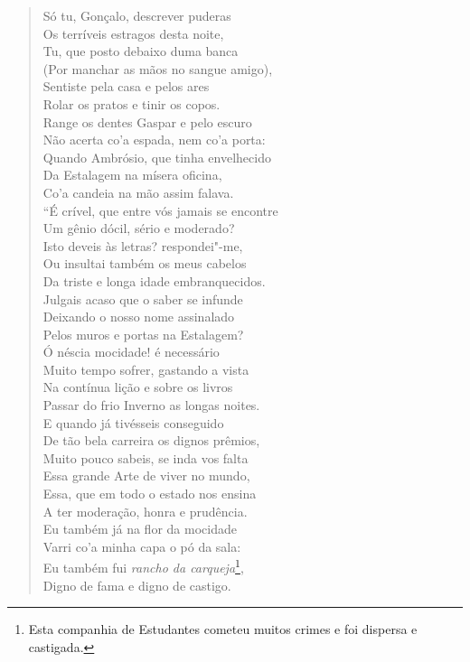 \begin{verse}
Só tu, Gonçalo, descrever puderas\\
Os terríveis estragos desta noite,\\
Tu, que posto debaixo duma banca\\
(Por manchar as mãos no sangue amigo),\\
Sentiste pela casa e pelos ares\\
Rolar os pratos e tinir os copos.\\
Range os dentes Gaspar e pelo escuro\\
Não acerta co'a espada, nem co'a porta:\\
Quando Ambrósio, que tinha envelhecido\\
Da Estalagem na mísera oficina,\\
Co'a candeia na mão assim falava.\\
``É crível, que entre vós jamais se encontre\\
Um gênio dócil, sério e moderado?\\
Isto deveis às letras? respondei"-me,\\
Ou insultai também os meus cabelos\\
Da triste e longa idade embranquecidos.\\
Julgais acaso que o saber se infunde\\
Deixando o nosso nome assinalado\\
Pelos muros e portas na Estalagem?\\
Ó néscia mocidade! é necessário\\
Muito tempo sofrer, gastando a vista\\
Na contínua lição e sobre os livros\\
Passar do frio Inverno as longas noites.\\
E quando já tivésseis conseguido\\
De tão bela carreira os dignos prêmios,\\
Muito pouco sabeis, se inda vos falta\\
Essa grande Arte de viver no mundo,\\
Essa, que em todo o estado nos ensina\\
A ter moderação, honra e prudência.\\
Eu também já na flor da mocidade\\
Varri co'a minha capa o pó da sala:\\
Eu também fui \textit{rancho da carqueja}\footnote{ Esta companhia de Estudantes cometeu muitos crimes e foi dispersa e castigada.},\\
Digno de fama e digno de castigo.\\

\end{verse}
